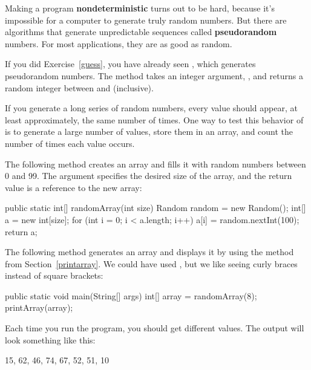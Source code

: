 
Making a program {\bf nondeterministic} turns out to be hard, because it's impossible for a computer to generate truly random numbers.
But there are algorithms that generate unpredictable sequences called {\bf pseudorandom} numbers.
For most applications, they are as good as random.



If you did Exercise~\ref{guess}, you have already seen , which generates pseudorandom numbers.
The method  takes an integer argument, , and returns a random integer between  and  (inclusive).

If you generate a long series of random numbers, every value should appear, at least approximately, the same number of times.
One way to test this behavior of  is to generate a large number of values, store them in an array, and count the number of times each value occurs.

The following method creates an  array and fills it with random numbers between 0 and 99.
The argument specifies the desired size of the array, and the return value is a reference to the new array:

\begin{code}
public static int[] randomArray(int size) {
    Random random = new Random();
    int[] a = new int[size];
    for (int i = 0; i < a.length; i++) {
        a[i] = random.nextInt(100);
    }
    return a;
}
\end{code}

The following  method generates an array and displays it by using the  method from Section~\ref{printarray}.
We could have used , but we like seeing curly braces instead of square brackets:

\begin{code}
public static void main(String[] args) {
    int[] array = randomArray(8);
    printArray(array);
}
\end{code}

Each time you run the program, you should get different values.
The output will look something like this:

\begin{stdout}
{15, 62, 46, 74, 67, 52, 51, 10}
\end{stdout}


